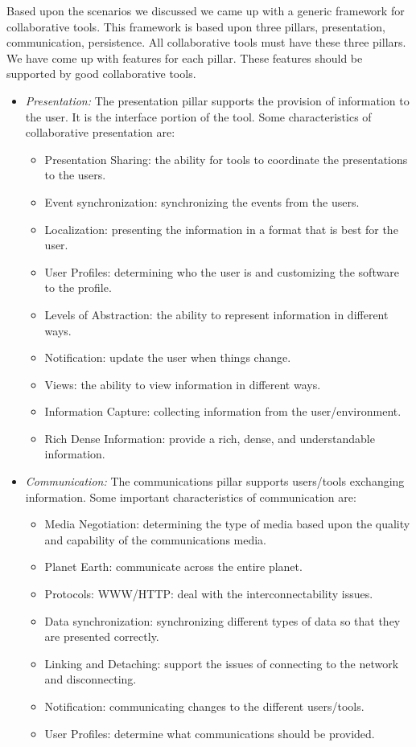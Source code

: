Based upon the scenarios we discussed we came up with a generic framework
for collaborative tools.  This framework is based upon three pillars,
presentation, communication, persistence.  All collaborative tools must
have these three pillars.  We have come up with features for each pillar.
These features should be supported by good collaborative tools.
\begin{itemize}
\item{\em Presentation:}  The presentation pillar supports the provision of 
  information to the user.  It is the interface portion of the tool.
  Some characteristics of collaborative presentation are:
  \begin{itemize}
  \item Presentation Sharing: the ability for tools to coordinate the
    presentations to the users.
  \item Event synchronization: synchronizing the events from the users.
  \item Localization: presenting the information in a format that is best
    for the user.
  \item User Profiles: determining who the user is and customizing the software to
    the profile.
  \item Levels of Abstraction: the ability to represent information
    in different ways.
  \item Notification: update the user when things change.
  \item Views: the ability to view information in different ways.
  \item Information Capture: collecting information from the user/environment.
  \item Rich Dense Information: provide a rich, dense, and understandable
    information.
  \end{itemize}

\item{\em Communication:}  The communications pillar supports users/tools
  exchanging information. Some important characteristics of communication are:
  \begin{itemize}
  \item Media Negotiation: determining the type of media based upon the
    quality and capability of the communications media.
  \item Planet Earth: communicate across the entire planet.
  \item Protocols: WWW/HTTP: deal with the interconnectability issues.
  \item Data synchronization: synchronizing different types of data so that
    they are presented correctly.
  \item Linking and Detaching: support the issues of connecting to
    the network and disconnecting.
  \item Notification: communicating changes to the different users/tools.
  \item User Profiles: determine what communications should be provided.
  \end{itemize}


\end{itemize}
